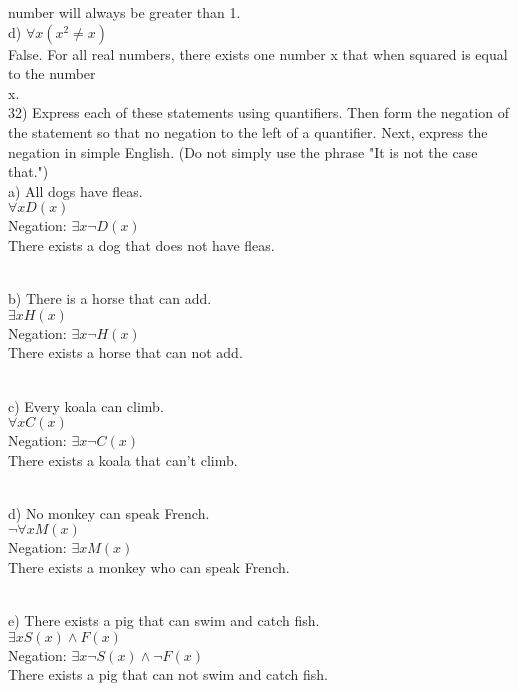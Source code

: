 \documentclass{article}
\begin{document}
\begin{flushleft}
\setlength\parindent{48pt} number will always be greater than 1.\\
\setlength\parindent{24pt}d) $\forall x (x^2 \neq x)$ \\
\setlength\parindent{48pt} False.  For all real numbers, there exists one number x that when squared is equal to the number 
\\x. \\
\setlength\parindent{0pt}32) Express each of these statements using quantifiers.  Then form the negation of the statement so that no negation to the left of a quantifier.  Next, express the negation in simple English.  (Do not simply use the phrase "It is not the case that.")
\\\setlength\parindent{24pt}a) All dogs have fleas.
\\\setlength\parindent{48pt} $\forall x D(x)$\setlength\parindent{48pt} 
\\\setlength\parindent{48pt} Negation: $\exists x \neg D(x)$
\\\setlength\parindent{48pt} There exists a dog that does not have fleas.

~\\\setlength\parindent{24pt}b) There is a horse that can add.
\\\setlength\parindent{48pt} $\exists x H(x)$
\\\setlength\parindent{48pt} Negation: $\exists x \neg H(x)$
\\\setlength\parindent{48pt} There exists a horse that can not add.

~\\\setlength\parindent{24pt}c) Every koala can climb.
\\\setlength\parindent{48pt} $\forall x C(x)$
\\\setlength\parindent{48pt} Negation: $\exists x \neg C(x)$
\\\setlength\parindent{48pt} There exists a koala that can't climb.

~\\\setlength\parindent{24pt}d) No monkey can speak French.
\\\setlength\parindent{48pt} $\neg \forall x M(x)$
\\\setlength\parindent{48pt} Negation: $\exists x M(x)$
\\\setlength\parindent{48pt} There exists a monkey who can speak French.

~\\\setlength\parindent{24pt}e) There exists a pig that can swim and catch fish.
\\\setlength\parindent{48pt} $\exists x S(x) \land F(x)$
\\\setlength\parindent{48pt} Negation: $\exists x \neg S(x) \land \neg F(x)$
\\\setlength\parindent{48pt} There exists a pig that can not swim and catch fish.



\end{flushleft}
\end{document}
